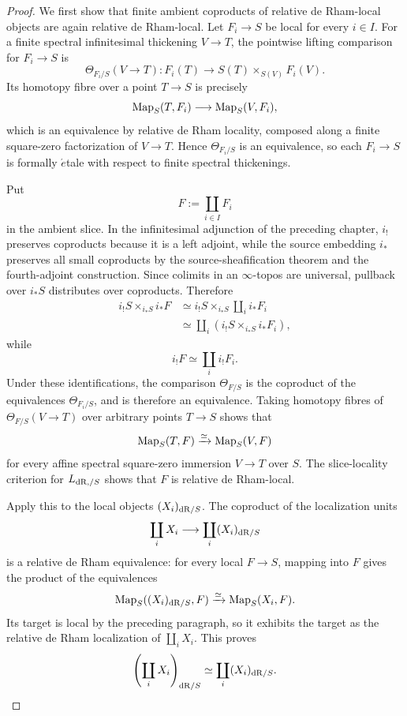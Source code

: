 \begin{proof}
We first show that finite ambient coproducts of relative de Rham-local objects are again relative de
Rham-local.  Let \(F_i\to S\) be local for every \(i\in I\).  For a finite spectral infinitesimal
thickening \(V\to T\), the pointwise lifting comparison for \(F_i\to S\) is
\[
    \Theta_{F_i/S}(V\to T):
    F_i(T)
    \longrightarrow
    S(T)\times_{S(V)}F_i(V).
\]
Its homotopy fibre over a point \(T\to S\) is precisely
\[
    \operatorname{Map}_S(T,F_i)
    \longrightarrow
    \operatorname{Map}_S(V,F_i),
\]
which is an equivalence by relative de Rham locality, composed along a finite square-zero
factorization of \(V\to T\).  Hence \(\Theta_{F_i/S}\) is an equivalence, so each
\(F_i\to S\) is formally \(\acute{e}\)tale with respect to finite spectral thickenings.

Put
\[
    F:=\coprod_{i\in I}F_i
\]
in the ambient slice.  In the infinitesimal adjunction of the preceding chapter, \(i_!\) preserves
coproducts because it is a left adjoint, while the source embedding \(i_*\) preserves all small
coproducts by the source-sheafification theorem and the fourth-adjoint construction.  Since colimits
in an \(\infty\)-topos are universal, pullback over \(i_*S\) distributes over coproducts.  Therefore
\[
\begin{aligned}
    i_!S\times_{i_*S}i_*F
    &\simeq
    i_!S\times_{i_*S}\coprod_i i_*F_i
    \\
    &\simeq
    \coprod_i\left(i_!S\times_{i_*S}i_*F_i\right),
\end{aligned}
\]
while
\[
    i_!F\simeq\coprod_i i_!F_i.
\]
Under these identifications, the comparison \(\Theta_{F/S}\) is the coproduct of the equivalences
\(\Theta_{F_i/S}\), and is therefore an equivalence.  Taking homotopy fibres of
\(\Theta_{F/S}(V\to T)\) over arbitrary points \(T\to S\) shows that
\[
    \operatorname{Map}_S(T,F)
    \xrightarrow{\simeq}
    \operatorname{Map}_S(V,F)
\]
for every affine spectral square-zero immersion \(V\to T\) over \(S\).  The slice-locality criterion
for \(L_{\mathrm{dR},/S}\) shows that \(F\) is relative de Rham-local.

Apply this to the local objects \((X_i)_{\mathrm{dR}/S}\).  The coproduct of the localization units
\[
    \coprod_iX_i
    \longrightarrow
    \coprod_i(X_i)_{\mathrm{dR}/S}
\]
is a relative de Rham equivalence: for every local \(F\to S\), mapping into \(F\) gives the product
of the equivalences
\[
    \operatorname{Map}_S((X_i)_{\mathrm{dR}/S},F)
    \xrightarrow{\simeq}
    \operatorname{Map}_S(X_i,F).
\]
Its target is local by the preceding paragraph, so it exhibits the target as the relative de Rham
localization of \(\coprod_iX_i\).  This proves
\[
    \left(\coprod_iX_i\right)_{\mathrm{dR}/S}
    \simeq
    \coprod_i(X_i)_{\mathrm{dR}/S}.
\]


\end{proof}
